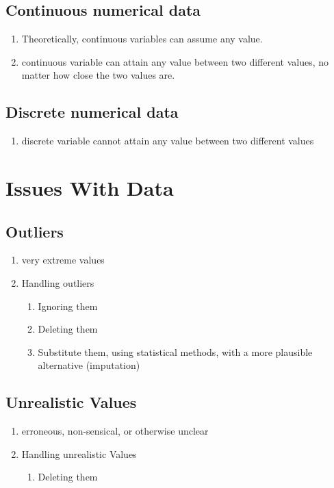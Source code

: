 \subsection{Continuous numerical data \cite{ism-1}}
\begin{enumerate}
    \item Theoretically, continuous variables can assume any value. 
    
    \item continuous variable can attain any value between two different values, no matter how close the two values are.
\end{enumerate}

\subsection{Discrete numerical data \cite{ism-1}}
\begin{enumerate}
    \item discrete variable cannot attain any value between two different values
\end{enumerate}



\section{Issues With Data}
\subsection{Outliers \cite{ism-1}}\label{outliers}
\begin{enumerate}
    \item very extreme values
    
    \item Handling outliers
    \begin{enumerate}
        \item Ignoring them
        \item Deleting them
        \item Substitute them, using statistical methods, with a more plausible alternative (imputation)
    \end{enumerate}
\end{enumerate}

\subsection{Unrealistic Values \cite{ism-1}}\label{unrealistic_values}
\begin{enumerate}
    \item erroneous, non-sensical, or otherwise unclear
    
    \item Handling unrealistic Values
    \begin{enumerate}
        \item Deleting them
    \end{enumerate}
\end{enumerate}

